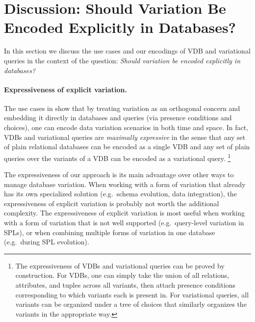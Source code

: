 \section{Discussion: Should Variation Be Encoded Explicitly in Databases?}
\label{sec:usecase-disc}

In this section we discuss the use cases and our encodings of VDB and variational queries
in the context of the question: \emph{Should
variation be encoded explicitly in databases?}


\paragraph{Expressiveness of explicit variation.}
%
The use cases in  show that by treating
variation as an orthogonal concern and embedding it directly in databases and
queries (via presence conditions and choices), one can encode data variation
scenarios in both time and space.
%
In fact, VDBs and variational queries are \emph{maximally expressive} in the sense that
any set of plain relational databases can be encoded as a single VDB and any
set of plain queries over the variants of a VDB can be encoded as a variational query.%
%
\footnote{The expressiveness of VDBs and variational queries can be proved by
construction. For VDBs, one can simply take the union of all relations,
attributes, and tuples across all variants, then attach presence conditions
corresponding to which variants each is present in. For variational queries, all variants
can be organized under a tree of choices that similarly organizes the variants
in the appropriate way.}


The expressiveness of our approach is its main advantage over other ways to
manage database variation. When working with a form of variation that already
has its own specialized solution (e.g.\ schema evolution, data integration),
the expressiveness of explicit variation is probably not worth the additional
complexity.
%
The expressiveness of explicit variation is most useful when working with a
form of variation that is not well supported (e.g.\ query-level variation in
SPLs), or when combining multiple forms of variation in one database (e.g.\
during SPL evolution).


